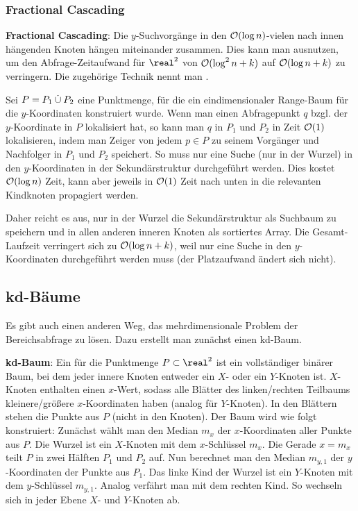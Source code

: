 \subsubsection{%
    Fractional Cascading%
}

\textbf{Fractional Cascading}:
Die $y$-Suchvorgänge in den $\mathcal{O}(\log n)$-vielen nach innen hängenden Knoten hängen miteinander
zusammen.
Dies kann man ausnutzen, um den Abfrage-Zeitaufwand für $\real^2$
von $\mathcal{O}(\log^2 n + k)$ auf $\mathcal{O}(\log n + k)$ zu verringern.
Die zugehörige Technik nennt man .

Sei $P = P_1 \mathbin{\dot{\cup}} P_2$ eine Punktmenge, für die ein eindimensionaler Range-Baum für
die $y$-Koordinaten konstruiert wurde.
Wenn man einen Abfragepunkt $q$ bzgl. der $y$-Koordinate in $P$ lokalisiert hat,
so kann man $q$ in $P_1$ und $P_2$ in Zeit $\mathcal{O}(1)$ lokalisieren,
indem man Zeiger von jedem $p \in P$ zu seinem Vorgänger und Nachfolger in $P_1$ und $P_2$
speichert.
So muss nur eine Suche (nur in der Wurzel) in den $y$-Koordinaten in der Sekundärstruktur
durchgeführt werden.
Dies kostet $\mathcal{O}(\log n)$ Zeit, kann aber jeweils in $\mathcal{O}(1)$ Zeit nach unten in die relevanten
Kindknoten propagiert werden.

Daher reicht es aus, nur in der Wurzel die Sekundärstruktur als Suchbaum zu speichern und
in allen anderen inneren Knoten als sortiertes Array.
Die Gesamt-Laufzeit verringert sich zu $\mathcal{O}(\log n + k)$, weil nur eine Suche in den $y$-Koordinaten
durchgeführt werden muss
(der Platzaufwand ändert sich nicht).

\pagebreak

\subsection{%
    kd-Bäume%
}

Es gibt auch einen anderen Weg, das mehrdimensionale Problem der Bereichsabfrage zu lösen.
Dazu erstellt man zunächst einen kd-Baum.

\textbf{kd-Baum}:
Ein  für die Punktmenge $P \subset \real^2$ ist ein vollständiger binärer Baum,
bei dem jeder innere Knoten entweder ein $X$- oder ein $Y$-Knoten ist.
$X$-Knoten enthalten einen $x$-Wert, sodass alle Blätter des linken/rechten Teilbaums
kleinere/größere $x$-Koordinaten haben (analog für $Y$-Knoten).
In den Blättern stehen die Punkte aus $P$ (nicht in den Knoten).
Der Baum wird wie folgt konstruiert:
Zunächst wählt man den Median $m_x$ der $x$-Koordinaten aller Punkte aus $P$.
Die Wurzel ist ein $X$-Knoten mit dem $x$-Schlüssel $m_x$.
Die Gerade $x = m_x$ teilt $P$ in zwei Hälften $P_1$ und $P_2$ auf.
Nun berechnet man den Median $m_{y,1}$ der $y$-Koordinaten der Punkte aus $P_1$.
Das linke Kind der Wurzel ist ein $Y$-Knoten mit dem $y$-Schlüssel $m_{y,1}$.
Analog verfährt man mit dem rechten Kind.
So wechseln sich in jeder Ebene $X$- und $Y$-Knoten ab.

